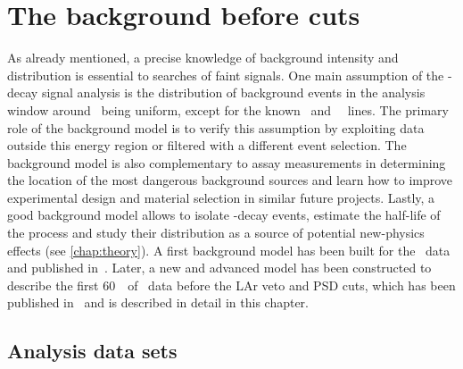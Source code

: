 
\chapter{The background before cuts}\label{chap:bkg:raw:ph2}

As already mentioned, a precise knowledge of background intensity and distribution is
essential to searches of faint signals. One main assumption of the \onbb-decay signal
analysis is the distribution of background events in the analysis window around \qbb\
being uniform, except for the known \Tl\ and \Bil\ \g\ lines. The primary role of the
background model is to verify this assumption by exploiting data outside this energy
region or filtered with a different event selection. The background model is also
complementary to assay measurements in determining the location of the most dangerous
background sources and learn how to improve experimental design and material selection in
similar future projects. Lastly, a good background model allows to isolate \nnbb-decay
events, estimate the half-life of the process and study their distribution as a source of
potential new-physics effects (see \cref{chap:theory}).
\newpar
A first background model has been built for the \phaseone\ data and published
in~\cite{Agostini2013a}. Later, a new and advanced model has been constructed to describe
the first 60~\kgyr\ of \phasetwo\ data before the LAr veto and PSD cuts, which has been
published in~\cite{Agostini2019b} and is described in detail in this chapter.

\section{Analysis data sets}%
\label{sec:bkg:raw:data}

\begin{table}[b]
  \centering
  \caption{%
    Properties of the data sets considered in this analysis. Further
    details about the \gerda\ detectors can be found in past
    publications~\cite{Agostini2013a, Agostini2018a}.
  }\label{tab:bkg:raw:ph2:datasets}
  \small
  
\end{table}%

